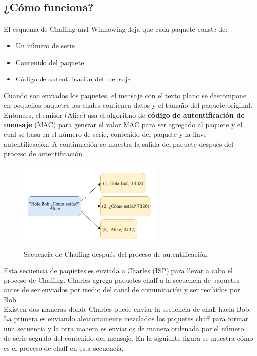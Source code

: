 \documentclass[12pt, a4paper, titlepage]{report}
\begin{document}
		\subsection{¿Cómo funciona?}
		
		\paragraph{}
		El esquema de Chaffing and Winnowing deja que cada paquete conste de: 
		\begin{itemize}
		    \item Un número de serie
		    \item Contenido del paquete
		    \item Código de autentificación del mensaje
		\end{itemize}
		Cuando son enviados los paquetes, el mensaje con el texto plano se descompone en pequeños paquetes los cuales contienen datos y el tamaño del paquete original. Entonces, el emisor (Alice) usa el algoritmo de \textbf{código de autentificación de mensaje} (MAC) para generar el valor MAC para ser agregado al paquete y el cual se basa en el número de serie, contenido del paquete y la llave autentificación. A continuación se muestra la salida del paquete después del proceso de autentificaci\'on.
		\begin{figure}[H]
			\begin{center}	                  \includegraphics[width=7cm]{./imagenes/MarcoTeorico/descomposicionChaffing.png}
				\caption{Secuencia de Chaffing después del proceso de autentificación.}
			\end{center}
		\end{figure}
		Esta secuencia de paquetes es enviada a Charles (ISP) para llevar a cabo el proceso de Chaffing. Charles agrega paquetes chaff a la secuencia de paquetes antes de ser enviados por medio del canal de comunicación y ser recibidos por Bob. \\
		Existen dos maneras donde Charles puede enviar la secuencia de chaff hacia Bob. La primera es enviando aleatoriamente mezclados los paquetes chaff para formar una secuencia y la otra manera es enviarlos de manera ordenada por el n\'umero de serie seguido del contenido del mensaje. En la siguiente figura se muestra cómo es el proceso de chaff en esta secuencia.
\end{document}
